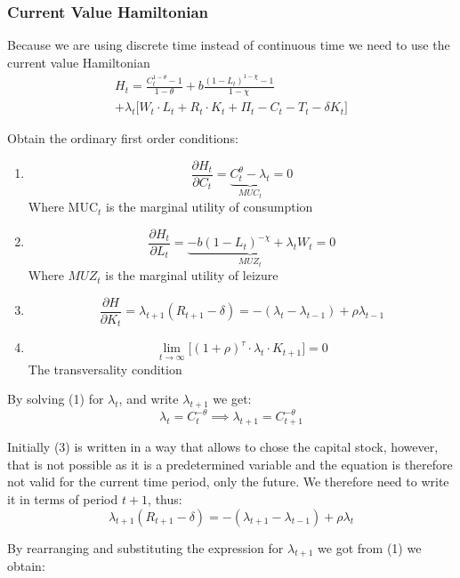 \subsubsection*{Current Value Hamiltonian}
Because we are using discrete time instead of continuous time we need to use the current value Hamiltonian 
\begin{multline*}
        H_t = \frac{C_t^{1 - \theta} - 1}{1 - \theta} + b \frac{(1 - L_t)^{1 - \chi} - 1}{1 - \chi} \\ + \lambda_t \bigg[  W_t \cdot L_t + R_t \cdot K_t + \Pi_t - C_t - T_t - \delta K_t \bigg]
\end{multline*}

Obtain the ordinary first order conditions:

\begin{enumerate}[ {(}1{)} ]
    \item 
        $$
            \frac{\partial H_t}{\partial C_t} = \underbrace{C_t^{\theta} - \lambda_t}_{MU C_t} = 0
        $$
        Where $\text{MUC}_t$ is the marginal utility of consumption
            \item 
        $$
            \frac{\partial H_t}{\partial L_t} = \underbrace{-b (1- L_t)^{ - \chi} + \lambda_t W_t}_{MU Z_t} = 0
        $$
        Where $MU Z_t$ is the marginal utility of leizure 
                    \item 
        $$
            \frac{\partial H}{\partial K_t} = \lambda_{t+1} (R_{t+1} - \delta) = - (\lambda_t - \lambda_{t-1}) + \rho \lambda_{t - 1} 
        $$
                            \item 
        $$
            \lim_{t\to\infty} \bigg[ (1 + \rho )^{\tau} \cdot \lambda_t \cdot K_{t+1} \bigg] = 0
        $$
        The transversality condition
\end{enumerate}

By solving (1) for $\lambda_t$, and write $\lambda_{t+1}$ we get:
$$
\lambda_t = C_t^{-\theta} \implies \lambda_{t+1}=C_{t+1}^{-\theta}
$$

Initially (3) is written in a way that allows to chose the capital stock, however, that is not possible as it is a predetermined variable and the equation is therefore not valid for the current time period, only the future. We therefore need to write it in terms of period $t+1$, thus:
        $$
        \lambda_{t+1} (R_{t+1} - \delta) = - (\lambda_{t+1} - \lambda_{t-1}) + \rho \lambda_{t}
        $$
        
By rearranging and substituting the expression for $\lambda_{t+1}$ we got from (1) we obtain:

